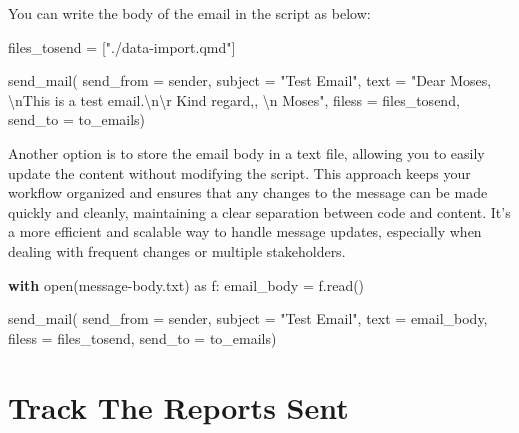 \documentclass[
  letterpaper,
  DIV=11,
  numbers=noendperiod]{scrreprt}
\newenvironment{Shaded}{\begin{snugshade}}{\end{snugshade}}
\newcommand{\BuiltInTok}[1]{\textcolor[rgb]{0.00,0.23,0.31}{#1}}
\newcommand{\CharTok}[1]{\textcolor[rgb]{0.13,0.47,0.30}{#1}}
\newcommand{\ControlFlowTok}[1]{\textcolor[rgb]{0.00,0.23,0.31}{\textbf{#1}}}
\newcommand{\ImportTok}[1]{\textcolor[rgb]{0.00,0.46,0.62}{#1}}
\newcommand{\NormalTok}[1]{\textcolor[rgb]{0.00,0.23,0.31}{#1}}
\newcommand{\OperatorTok}[1]{\textcolor[rgb]{0.37,0.37,0.37}{#1}}
\newcommand{\StringTok}[1]{\textcolor[rgb]{0.13,0.47,0.30}{#1}}
\begin{document}
You can write the body of the email in the script as below:

\begin{Shaded}
\begin{Highlighting}[]
\NormalTok{files\_tosend }\OperatorTok{=}\NormalTok{ [}\StringTok{"./data{-}import.qmd"}\NormalTok{]   }
    
\NormalTok{send\_mail(}
\NormalTok{  send\_from }\OperatorTok{=}\NormalTok{ sender,}
\NormalTok{  subject }\OperatorTok{=} \StringTok{"Test Email"}\NormalTok{,}
\NormalTok{  text }\OperatorTok{=} \StringTok{"Dear Moses, }\CharTok{\textbackslash{}n}\StringTok{This is a test email.}\CharTok{\textbackslash{}n\textbackslash{}r}\StringTok{ Kind regard,, }\CharTok{\textbackslash{}n}\StringTok{ Moses"}\NormalTok{,}
\NormalTok{  filess }\OperatorTok{=}\NormalTok{ files\_tosend,}
\NormalTok{  send\_to }\OperatorTok{=}\NormalTok{ to\_emails)}
\end{Highlighting}
\end{Shaded}

Another option is to store the email body in a text file, allowing you
to easily update the content without modifying the script. This approach
keeps your workflow organized and ensures that any changes to the
message can be made quickly and cleanly, maintaining a clear separation
between code and content. It's a more efficient and scalable way to
handle message updates, especially when dealing with frequent changes or
multiple stakeholders.

\begin{Shaded}
\begin{Highlighting}[]
\ControlFlowTok{with} \BuiltInTok{open}\NormalTok{(}\StringTok{\textquotesingle{}message{-}body.txt\textquotesingle{}}\NormalTok{) }\ImportTok{as}\NormalTok{ f:}
\NormalTok{  email\_body }\OperatorTok{=}\NormalTok{ f.read()}
  
  
\NormalTok{send\_mail(}
\NormalTok{  send\_from }\OperatorTok{=}\NormalTok{ sender,}
\NormalTok{  subject }\OperatorTok{=} \StringTok{"Test Email"}\NormalTok{,}
\NormalTok{  text }\OperatorTok{=}\NormalTok{ email\_body,}
\NormalTok{  filess }\OperatorTok{=}\NormalTok{ files\_tosend,}
\NormalTok{  send\_to }\OperatorTok{=}\NormalTok{ to\_emails) }
\end{Highlighting}
\end{Shaded}

\section{Track The Reports Sent}\label{track-the-reports-sent}
\end{document}
